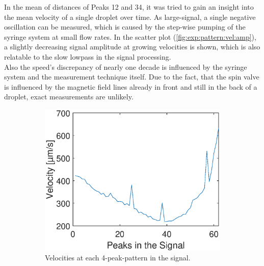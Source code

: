 In the mean of distances of Peaks 12 and 34, it was tried to gain an insight into the mean velocity of a single droplet over time. As large-signal, a single negative oscillation can be measured, which is caused by the step-wise pumping of the syringe system at small flow rates. In the scatter plot (\protect\ref{fig:exp:pattern:vel:amp}), a slightly decreasing signal amplitude at growing velocities is shown, which is also relatable to the slow lowpass in the signal processing.\\
Also the speed's discrepancy of nearly one decade is influenced by the syringe system and the measurement technique itself. Due to the fact, that the spin valve is influenced by the magnetic field lines already in front and still in the back of a droplet, exact measurements are unlikely. 

\begin{figure}[h]
	\begin{subfigure}[l]{0.49\textwidth} 
		\centering
		\includegraphics[clip,trim={0mm 0mm 0mm 0mm}, width=1.1\linewidth]{Ressourcen/Results/Measurement/Vel_12}
		\caption{Velocities at each 4-peak-pattern in the signal.}
		\label{fig:exp:pattern:vel:12}
	\end{subfigure}
	\hfill
	\begin{subfigure}[r]{0.49\textwidth} 
		\centering

\end{subfigure}
\end{figure}
